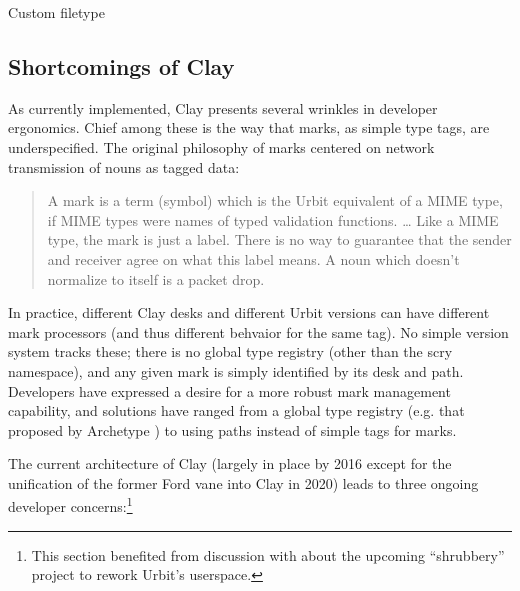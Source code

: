 \documentclass[twoside]{article}
\begin{document}
Custom filetype 

\subsection[Shortcomings]{Shortcomings of Clay}

As currently implemented, Clay presents several wrinkles in developer ergonomics.  Chief among these is the way that marks, as simple type tags, are underspecified.  The original philosophy of marks centered on network transmission of nouns as tagged data:

\begin{quote}
  A mark is a term (symbol) which is the Urbit equivalent of a MIME type, if MIME types were names of typed validation functions.  \ldots{} Like a MIME type, the mark is just a label. There is no way to guarantee that the sender and receiver agree on what this label means.  A noun which doesn't normalize to itself is a packet drop.  \citep[pp. 51–52]{Whitepaper}
\end{quote}

\noindent
In practice, different Clay desks and different Urbit versions can have different mark processors (and thus different behvaior for the same tag).  No simple version system tracks these; there is no global type registry (other than the scry namespace), and any given mark is simply identified by its desk and path.  Developers have expressed a desire for a more robust mark management capability, and solutions have ranged from a global type registry (e.g. that proposed by Archetype \citep{TODO}) to using paths instead of simple tags for marks.

The current architecture of Clay (largely in place by 2016 except for the unification of the former Ford vane into Clay in 2020) leads to three ongoing developer concerns:\footnote{This section benefited from discussion with  about the upcoming ``shrubbery'' project to rework Urbit's userspace.}
\end{document}
